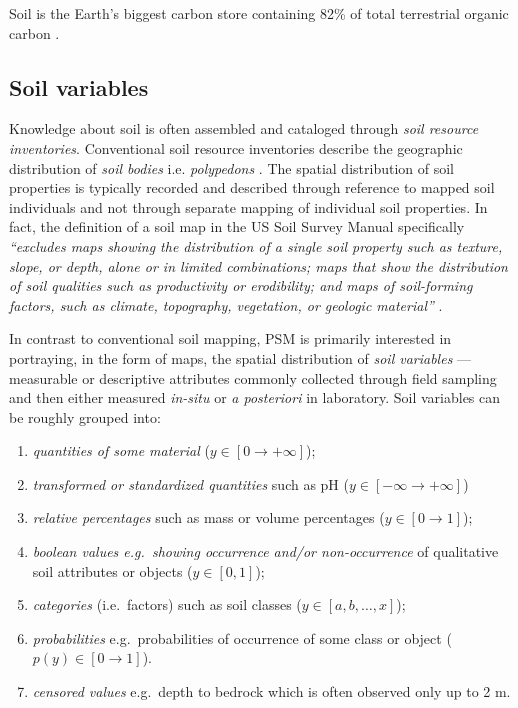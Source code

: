 \documentclass[graybox,natbib,nospthms,UStrade]{svmono}
\begin{document}
Soil is the Earth's biggest carbon store containing 82\% of total terrestrial
organic carbon \citep{Lal2004Science}.

\hypertarget{soil-variables}{%
\subsection{Soil variables}\label{soil-variables}}

Knowledge about soil is often assembled and cataloged through \emph{soil
resource inventories}. Conventional soil resource inventories describe
the geographic distribution of \emph{soil bodies} i.e. \emph{polypedons}
\citep{Wysocki2005Geoderma}. The spatial distribution of soil properties is
typically recorded and described through reference to mapped soil
individuals and not through separate mapping of individual soil
properties. In fact, the definition of a soil map in the US Soil Survey
Manual specifically \emph{``excludes maps showing the distribution of a single
soil property such as texture, slope, or depth, alone or in limited
combinations; maps that show the distribution of soil qualities such as
productivity or erodibility; and maps of soil-forming factors, such as
climate, topography, vegetation, or geologic material''} \citep{SSDS1993}.

In contrast to conventional soil mapping, PSM is primarily interested
in portraying, in the form of maps, the spatial distribution of \emph{soil variables} --- measurable
or descriptive attributes commonly collected through field sampling
and then either measured \emph{in-situ} or \emph{a posteriori} in laboratory. Soil variables can be roughly grouped into:

\begin{enumerate}
\def\labelenumi{\arabic{enumi}.}
\item
  \emph{quantities of some material} (\(y \in [0 \rightarrow +\infty]\));
\item
  \emph{transformed or standardized quantities} such as pH
  (\(y \in [-\infty \rightarrow +\infty]\))
\item
  \emph{relative percentages} such as mass or volume percentages
  (\(y \in [0 \rightarrow 1]\));
\item
  \emph{boolean values e.g.~showing occurrence and/or non-occurrence} of
  qualitative soil attributes or objects (\(y \in [0,1]\));
\item
  \emph{categories} (i.e.~factors) such as soil classes
  (\(y \in [a,b,\ldots,x]\));
\item
  \emph{probabilities} e.g.~probabilities of occurrence of some class or object (\(p(y) \in [0 \rightarrow 1]\)).
\item
  \emph{censored values} e.g.~depth to bedrock which is often observed only up to 2 m.
\end{enumerate}
\end{document}
